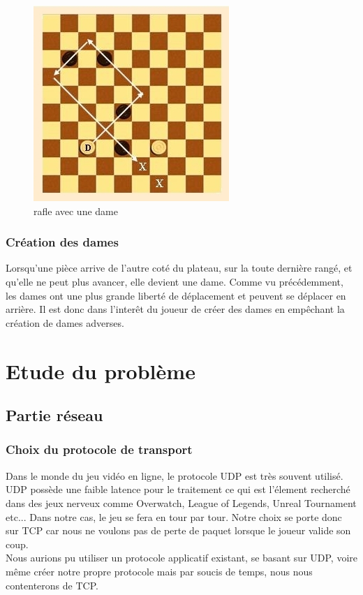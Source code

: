 \documentclass{article}
\begin{document}
        \begin{figure}[!htp]
            \centerline{\includegraphics[scale=0.5]{images/prise_dame.jpg}}
            \caption{\label{étiquette} rafle avec une dame}
        \end{figure}

    \subsubsection{Création des dames}
        Lorsqu'une pièce arrive de l'autre coté du plateau, sur la toute dernière rangé, et qu'elle ne peut plus avancer, elle devient une dame.
        Comme vu précédemment, les dames ont une plus grande liberté de déplacement et peuvent se déplacer en arrière. Il est donc dans l'interêt
        du joueur de créer des dames en empêchant la création de dames adverses.

    \section{Etude du problème}
    \subsection{Partie réseau}
    \subsubsection{Choix du protocole de transport}
        Dans le monde du jeu vidéo en ligne, le protocole UDP est très souvent utilisé. UDP possède une faible latence pour le traitement
        ce qui est l'élement recherché dans des jeux nerveux comme Overwatch, League of Legends, Unreal Tournament etc... Dans notre
        cas, le jeu se fera en tour par tour. Notre choix se porte donc sur TCP car nous ne voulons pas de perte de paquet lorsque le joueur
        valide son coup.\\
        Nous aurions pu utiliser un protocole applicatif existant, se basant sur UDP, voire même créer notre propre protocole mais par soucis
        de temps, nous nous contenterons de TCP.
\end{document}
